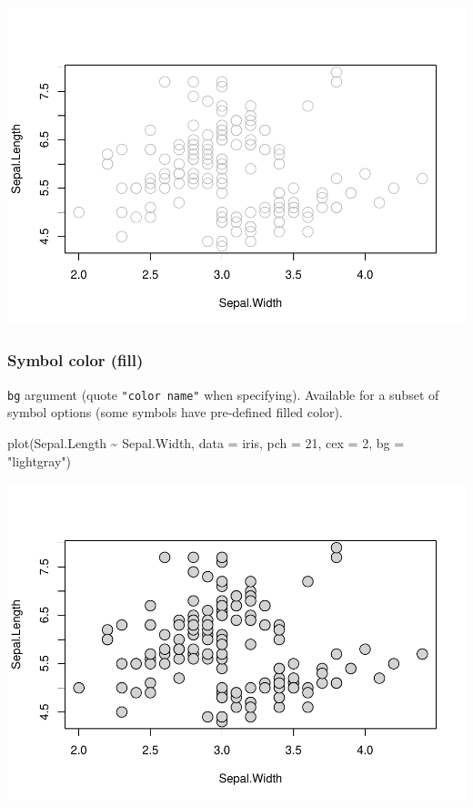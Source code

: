 \documentclass[
]{article}
\newenvironment{Shaded}{\begin{snugshade}}{\end{snugshade}}
\newcommand{\AttributeTok}[1]{\textcolor[rgb]{0.77,0.63,0.00}{#1}}
\newcommand{\DecValTok}[1]{\textcolor[rgb]{0.00,0.00,0.81}{#1}}
\newcommand{\FunctionTok}[1]{\textcolor[rgb]{0.00,0.00,0.00}{#1}}
\newcommand{\NormalTok}[1]{#1}
\newcommand{\SpecialCharTok}[1]{\textcolor[rgb]{0.00,0.00,0.00}{#1}}
\newcommand{\StringTok}[1]{\textcolor[rgb]{0.31,0.60,0.02}{#1}}
\begin{document}
\begin{center}\includegraphics{biostats_files/figure-latex/unnamed-chunk-126-1} \end{center}

\hypertarget{symbol-color-fill}{%
\subsubsection{Symbol color (fill)}\label{symbol-color-fill}}

\texttt{bg} argument (quote \texttt{"color\ name"} when specifying). Available for a subset of symbol options (some symbols have pre-defined filled color).

\begin{Shaded}
\begin{Highlighting}[]
\FunctionTok{plot}\NormalTok{(Sepal.Length }\SpecialCharTok{\textasciitilde{}}\NormalTok{ Sepal.Width, }\AttributeTok{data =}\NormalTok{ iris,}
     \AttributeTok{pch =} \DecValTok{21}\NormalTok{, }\AttributeTok{cex =} \DecValTok{2}\NormalTok{, }\AttributeTok{bg =} \StringTok{"lightgray"}\NormalTok{)}
\end{Highlighting}
\end{Shaded}

\begin{center}\includegraphics{biostats_files/figure-latex/unnamed-chunk-127-1} \end{center}
\end{document}
